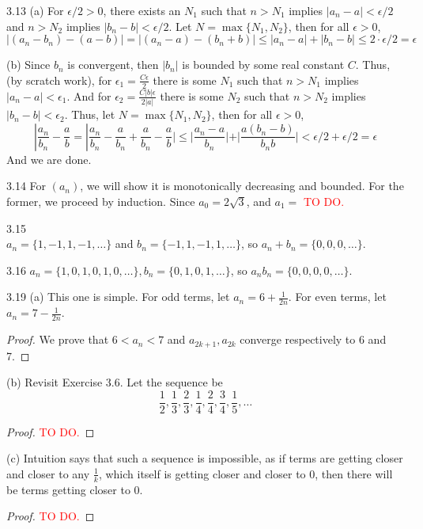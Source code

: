 3.13 (a) For $\epsilon/2>0$, there exists an $N_1$ such that $n>N_1$ implies $|a_n-a|<\epsilon/2$ and $n>N_2$ implies $|b_n-b|<\epsilon/2$. Let $N=\max\{N_1,N_2\}$, then for
all $\epsilon>0$, 
\[
    |(a_n-b_n)-(a-b)|
    =|(a_n-a)-(b_n + b)|
    \leq |a_n-a|+|b_n-b|
    \leq 2 \cdot \epsilon/2
    =\epsilon
    \]

(b) Since $b_n$ is convergent, then $|b_n|$ is bounded by some real constant $C$. Thus, (by scratch work),
for $\epsilon_1=\frac{C\epsilon}{2}$ there is some $N_1$ such that $n>N_1$ implies $|a_n-a|<\epsilon_1$. And for 
$\epsilon_2=\frac{C|b|\epsilon}{2|a|}$ there is some $N_2$ such that $n>N_2$ implies $|b_n-b|<\epsilon_2$. Thus,
let $N=\max\{N_1, N_2\}$, then for all $\epsilon > 0$,
\[
    |\frac{a_n}{b_n}-\frac{a}{b}=|\frac{a_n}{b_n}-\frac{a}{b_n}+\frac{a}{b_n}-\frac{a}{b}|
    \leq |\frac{a_n-a}{b_n}|+|\frac{a(b_n-b)}{b_n b}| < \epsilon/2+\epsilon/2=\epsilon
    \]
And we are done.

3.14 For $(a_n)$, we will show it is monotonically decreasing and bounded. For the former, we proceed by induction. 
Since $a_0=2\sqrt{3}$, and $a_1=$ \textcolor{red}{TO DO.}

3.15 
\\$a_n=\{1,-1,1,-1,\dots\}$ and $b_n=\{-1,1,-1,1,\dots\}$, so $a_n+b_n=\{0,0,0,\dots\}$.

3.16 $a_n=\{1,0,1,0,1,0,\dots\}, b_n=\{0,1,0,1,\dots\}$, so $a_n b_n=\{0,0,0,0,\dots\}$.

3.19 (a) This one is simple. For odd terms, let $a_n=6+\frac{1}{2n}$. For even terms, let $a_n=7-\frac{1}{2n}$. 
\begin{proof}
    We prove that $6<a_n<7$ and $a_{2k+1}, a_{2k}$ converge respectively to 6 and 7.
\end{proof}

(b) Revisit Exercise 3.6. Let the sequence be
\[
\frac{1}{2}, \frac{1}{3}, \frac{2}{3}, \frac{1}{4}, \frac{2}{4}, \frac{3}{4}, \frac{1}{5}, \dots    
\]

\begin{proof}
    \textcolor{red}{TO DO.}
\end{proof}

(c) Intuition says that such a sequence is impossible, as if terms are getting closer and closer to any $\frac{1}{k}$, which itself is getting closer and closer to 0, then there will be terms getting closer to 0. 

\begin{proof}
    \textcolor{red}{TO DO.}
\end{proof}

